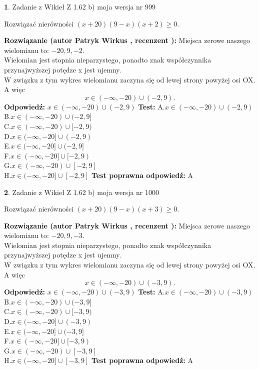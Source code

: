 \documentclass[12pt, a4paper]{article}
\theoremstyle{definition} %
\newtheorem{zad}{}
\newcommand{\zadStart}[1]{\begin{zad}#1\newline}
\newcommand{\zadStop}{\end{zad}}
\newcommand{\rozwStart}[2]{\noindent \textbf{Rozwiązanie (autor #1 , recenzent #2): }\newline}
\newcommand{\rozwStop}{\newline}
\newcommand{\odpStart}{\noindent \textbf{Odpowiedź:}\newline}
\newcommand{\odpStop}{\newline}
\newcommand{\testStart}{\noindent \textbf{Test:}\newline}
\newcommand{\testStop}{\newline}
\newcommand{\kluczStart}{\noindent \textbf{Test poprawna odpowiedź:}\newline}
\newcommand{\kluczStop}{\newline}
\begin{document}
\zadStart{Zadanie z Wikieł Z 1.62 b) moja wersja nr 999}

Rozwiązać nierówności $(x+20)(9-x)(x+2)\ge0$.
\zadStop
\rozwStart{Patryk Wirkus}{}
Miejsca zerowe naszego wielomianu to: $-20, 9, -2$.\\
Wielomian jest stopnia nieparzystego, ponadto znak współczynnika przy\linebreak najwyższej potędze x jest ujemny.\\ W związku z tym wykres wielomianu zaczyna się od lewej strony powyżej osi OX. A więc $$x \in (-\infty,-20) \cup (-2,9).$$
\rozwStop
\odpStart
$x \in (-\infty,-20) \cup (-2,9)$
\odpStop
\testStart
A.$x \in (-\infty,-20) \cup (-2,9)$\\
B.$x \in (-\infty,-20) \cup (-2,9]$\\
C.$x \in (-\infty,-20) \cup [-2,9)$\\
D.$x \in (-\infty,-20] \cup (-2,9)$\\
E.$x \in (-\infty,-20] \cup (-2,9]$\\
F.$x \in (-\infty,-20] \cup [-2,9)$\\
G.$x \in (-\infty,-20) \cup [-2,9]$\\
H.$x \in (-\infty,-20] \cup [-2,9]$
\testStop
\kluczStart
A
\kluczStop



\zadStart{Zadanie z Wikieł Z 1.62 b) moja wersja nr 1000}

Rozwiązać nierówności $(x+20)(9-x)(x+3)\ge0$.
\zadStop
\rozwStart{Patryk Wirkus}{}
Miejsca zerowe naszego wielomianu to: $-20, 9, -3$.\\
Wielomian jest stopnia nieparzystego, ponadto znak współczynnika przy\linebreak najwyższej potędze x jest ujemny.\\ W związku z tym wykres wielomianu zaczyna się od lewej strony powyżej osi OX. A więc $$x \in (-\infty,-20) \cup (-3,9).$$
\rozwStop
\odpStart
$x \in (-\infty,-20) \cup (-3,9)$
\odpStop
\testStart
A.$x \in (-\infty,-20) \cup (-3,9)$\\
B.$x \in (-\infty,-20) \cup (-3,9]$\\
C.$x \in (-\infty,-20) \cup [-3,9)$\\
D.$x \in (-\infty,-20] \cup (-3,9)$\\
E.$x \in (-\infty,-20] \cup (-3,9]$\\
F.$x \in (-\infty,-20] \cup [-3,9)$\\
G.$x \in (-\infty,-20) \cup [-3,9]$\\
H.$x \in (-\infty,-20] \cup [-3,9]$
\testStop
\kluczStart
A
\kluczStop
\end{document}
